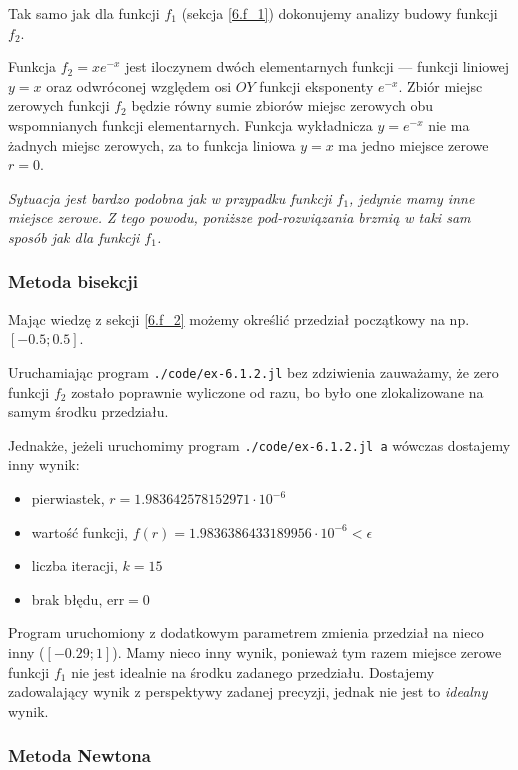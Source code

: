 \documentclass[10pt]{article}
\begin{document}
Tak samo jak dla funkcji $f_1$ (sekcja \ref{6.f_1}) dokonujemy analizy budowy funkcji $f_2$.

\noindent Funkcja $f_2 = xe^{-x}$ jest iloczynem dwóch elementarnych funkcji — funkcji liniowej $y = x$ oraz odwróconej względem osi $OY$ funkcji eksponenty $e^{-x}$. Zbiór miejsc zerowych funkcji $f_2$ będzie równy sumie zbiorów miejsc zerowych obu wspomnianych funkcji elementarnych. Funkcja wykładnicza $y = e^{-x}$ nie ma żadnych miejsc zerowych, za to funkcja liniowa $y = x$ ma jedno miejsce zerowe $r = 0$.

\textit{Sytuacja jest bardzo podobna jak w przypadku funkcji $f_1$, jedynie mamy inne miejsce zerowe. Z tego powodu, poniższe pod-rozwiązania brzmią w taki sam sposób jak dla funkcji $f_1$.}

\subsubsection{Metoda bisekcji}

Mając wiedzę z sekcji \ref{6.f_2} możemy określić przedział początkowy na np. $[-0.5; 0.5]$.

Uruchamiając program \texttt{./code/ex-6.1.2.jl} bez zdziwienia zauważamy, że zero funkcji $f_2$ zostało poprawnie wyliczone od razu, bo było one zlokalizowane na samym środku przedziału.

\noindent Jednakże, jeżeli uruchomimy program \texttt{./code/ex-6.1.2.jl a} wówczas dostajemy inny wynik:
\begin{itemize}
    \item pierwiastek, $r = 1.983642578152971 \cdot 10^{-6}$
    \item wartość funkcji, $f(r) = 1.9836386433189956 \cdot 10^{-6} < \epsilon$
    \item liczba iteracji, $k = 15$
    \item brak błędu, $\mathrm{err} = 0$
\end{itemize}

Program uruchomiony z dodatkowym parametrem zmienia przedział na nieco inny ($[-0.29; 1]$). Mamy nieco inny wynik, ponieważ tym razem miejsce zerowe funkcji $f_1$ nie jest idealnie na środku zadanego przedziału. Dostajemy zadowalający wynik z perspektywy zadanej precyzji, jednak nie jest to \textit{idealny} wynik.

\subsubsection{Metoda Newtona}
\end{document}

